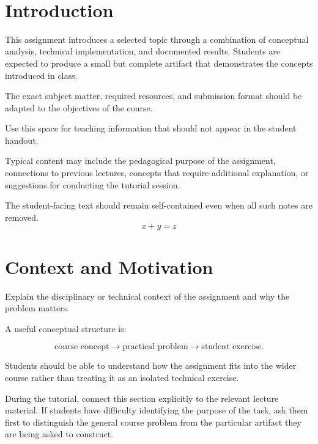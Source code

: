 \documentclass[11pt]{article}
\title{\textbf{\AssignmentTitle}}
\author{
    \InstructorName\\
    \InstructorEmail
}
\date{\Semester}
\newif\iftutornotes
\newcommand{\EditionLabel}{%
    \iftutornotes
        \begin{center}
            {\small\color{tutorblue}
            TA / Tutor Teaching Edition}
        \end{center}
        \vspace{0.5em}
    \fi
}
\begin{document}
\maketitle
\EditionLabel

\section*{Introduction}

This assignment introduces a selected topic through a combination of
conceptual analysis, technical implementation, and documented results.
Students are expected to produce a small but complete artifact that
demonstrates the concepts introduced in class.

The exact subject matter, required resources, and submission format should
be adapted to the objectives of the course.

\begin{tutornote}
Use this space for teaching information that should not appear in the
student handout.

Typical content may include the pedagogical purpose of the assignment,
connections to previous lectures, concepts that require additional
explanation, or suggestions for conducting the tutorial session.

The student-facing text should remain self-contained even when all such
notes are removed.
$$
x+y=z
$$
\end{tutornote}

\section{Context and Motivation}

Explain the disciplinary or technical context of the assignment and why the
problem matters.

A useful conceptual structure is:

\[
\text{course concept}
\longrightarrow
\text{practical problem}
\longrightarrow
\text{student exercise}.
\]

Students should be able to understand how the assignment fits into the wider
course rather than treating it as an isolated technical exercise.

\begin{tutornote}
During the tutorial, connect this section explicitly to the relevant lecture
material. If students have difficulty identifying the purpose of the task,
ask them first to distinguish the general course problem from the particular
artifact they are being asked to construct.
\end{tutornote}
\end{document}
